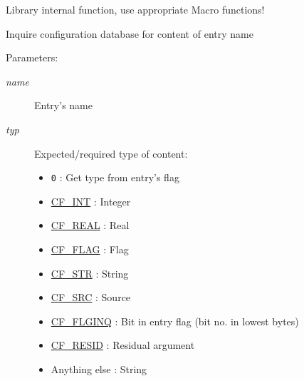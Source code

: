 Library internal function, use appropriate Macro functions! 

Inquire configuration database for content of entry name

\begin{Desc}
\item[Parameters:]
\begin{description}
\item[{\em name}]Entry's name \item[{\em typ}]Expected/required type of content: \begin{itemize}
\item {\tt 0} : Get type from entry's flag \item \hyperlink{group__special__options__mask_gb33869d596619ad14675c053925a42e0}{CF\_\-INT} : Integer \item \hyperlink{group__special__options__mask_geefdbef320cbd7179f1fb0ebe0fcf5ce}{CF\_\-REAL} : Real \item \hyperlink{group__special__options__mask_g1d1f1d1b6eac6b5d9970102318ab2667}{CF\_\-FLAG} : Flag \item \hyperlink{group__special__options__mask_g64c30a2865061d0c1074bc6ec91e3dcf}{CF\_\-STR} : String \item \hyperlink{group__special__options__mask_gd9b1f659b11c529a0ed1035caf8b239b}{CF\_\-SRC} : Source \item \hyperlink{group__special__options__mask_g36792935eec7c6636b6aea8df82f7480}{CF\_\-FLGINQ} : Bit in entry flag (bit no. in lowest bytes) \item \hyperlink{group__special__options__mask_g5415b257c706aae33d91d3947a3429c0}{CF\_\-RESID} : Residual argument \item Anything else : String\end{itemize}
\end{description}
\end{Desc}
